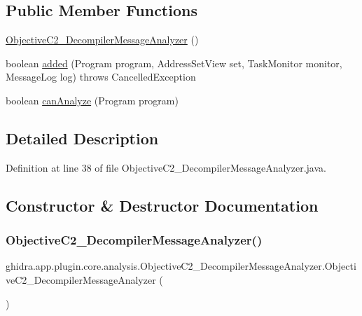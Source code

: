 \subsection*{Public Member Functions}
\begin{DoxyCompactItemize}
\item 
\mbox{\hyperlink{classghidra_1_1app_1_1plugin_1_1core_1_1analysis_1_1_objective_c2___decompiler_message_analyzer_a262ff4ab7529c6fc716f0206c72e7754}{Objective\+C2\+\_\+\+Decompiler\+Message\+Analyzer}} ()
\item 
boolean \mbox{\hyperlink{classghidra_1_1app_1_1plugin_1_1core_1_1analysis_1_1_objective_c2___decompiler_message_analyzer_aab21d0fb932680f61fbed51dee298f75}{added}} (Program program, Address\+Set\+View set, Task\+Monitor monitor, Message\+Log log)  throws Cancelled\+Exception 
\item 
boolean \mbox{\hyperlink{classghidra_1_1app_1_1plugin_1_1core_1_1analysis_1_1_objective_c2___decompiler_message_analyzer_a2c107a228df99bacc6cf36fe2e3a4e20}{can\+Analyze}} (Program program)
\end{DoxyCompactItemize}


\subsection{Detailed Description}


Definition at line 38 of file Objective\+C2\+\_\+\+Decompiler\+Message\+Analyzer.\+java.



\subsection{Constructor \& Destructor Documentation}
\mbox{\label{classghidra_1_1app_1_1plugin_1_1core_1_1analysis_1_1_objective_c2___decompiler_message_analyzer_a262ff4ab7529c6fc716f0206c72e7754}} 
\subsubsection{\texorpdfstring{ObjectiveC2\_DecompilerMessageAnalyzer()}{ObjectiveC2\_DecompilerMessageAnalyzer()}}
{\footnotesize\ttfamily ghidra.\+app.\+plugin.\+core.\+analysis.\+Objective\+C2\+\_\+\+Decompiler\+Message\+Analyzer.\+Objective\+C2\+\_\+\+Decompiler\+Message\+Analyzer (\begin{DoxyParamCaption}{ }\end{DoxyParamCaption})\hspace{0.3cm}{\ttfamily [inline]}}



